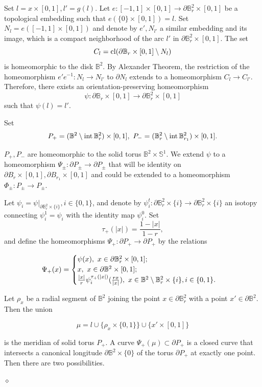 \documentclass[%
 aip,
 amsmath,amssymb,
preprint,%
]{revtex4-1}
\newenvironment{proof}{{\bf Proof:}}
{\hfill $\diamond$\medskip}
\begin{document}
\begin{proof} Set $l=x\times [0,1], l'=g(l)$. Let $e:[-1,1]\times [0,1]\to \partial \mathbb B^2_r\times [0,1]$ be a topological embedding such that $e(\{0\}\times [0,1])=l$. Set $N_l=e([-1,1]\times [0,1])$ and denote by $e', N_{l'}$ a similar embedding and its image, which is a compact neighborhood of the arc $l'$ in $\partial \mathbb B^2_r\times [0,1]$.
The set $$C_l={\rm cl} (\partial \mathbb B_r\times [0,1]\setminus N_l)$$ is homeomorphic to the disk $\mathbb B^2$. By Alexander Theorem, the restriction of the homeomorphism $e'e^{-1}: N_l\to N_{l'}$ to $\partial N_l$ extends to a homeomorphism $C_l\to C_{l'}$. Therefore, there exists an orientation-preserving homeomorphism
$$\psi: \partial \mathbb B_r\times [0,1]\to \partial \mathbb B^2_r\times [0,1]$$
such that $\psi(l)=l'$. 

Set $$P_+=(\mathbb B^2\setminus {\rm int}\, \mathbb B^2_{r}) \times [0,1],\  P_-=(\mathbb B^2_{r}\setminus {\rm int}\, \mathbb B^2_{r_1}) \times [0,1].$$

 $P_+, P_-$ are homeomorphic to the solid torus   $\mathbb B^2\times \mathbb S^1$. We extend $\psi$ to a homeomorphism $\Psi_\pm:\partial P_\pm\to \partial P_\pm$ that will be identity on $\partial B_r\times [0,1], \partial B_{r_1}\times [0,1]$ and could be extended to a homeomorphism $\Phi_\pm: P_\pm\to P_\pm$. 

Let $\psi_{i}=\psi|_{\partial \mathbb B^2_r\times \{i\}}, i\in \{0,1\}$, and denote by $\psi^t_i: \partial \mathbb B^2_r\times \{i\}\to \partial \mathbb B^2_r\times \{i\}$ an isotopy connecting $\psi^1_i=\psi_i$ with the identity map $\psi^0_i$.  Set $$\tau_+(|x|)=\frac{1-|x|}{1-r},$$ and  define the   homeomorphisms $\Psi_+: \partial P_+\to \partial P_+$ by the relations

$$
\Psi_+(x)=\begin{cases}\psi(x),\ x\in \partial \mathbb B^2_r\times [0,1];\cr
x,\ x\in \partial \mathbb B^2\times [0,1];\cr
\frac{|x|}{r} \psi^{\tau_+(|x|)}_i(\frac{rx}{|x|}),\ x\in \mathbb B^2\setminus \mathbb B^2_r\times \{i\}, i\in \{0,1\}.
\end{cases}
$$

Let  $\rho_{x}$  be a radial  segment of   $\mathbb B^2$ joining the point $x\in \partial \mathbb B^2_r$ with a point  $x'\in \partial \mathbb B^2$. Then the union 

$$\mu=l\cup \{\rho_x\times \{0,1\}\}\cup \{x'\times [0,1]\}$$

is the meridian of solid torus $P_+$. A curve $\Psi_+(\mu)\subset \partial P_+$ is a closed curve that intersects a canonical longitude $\partial \mathbb B^2\times \{0\}$ of the torus $\partial P_+$ at exactly one point. Then there  are two possibilities. 


\end{proof}
\end{document}
